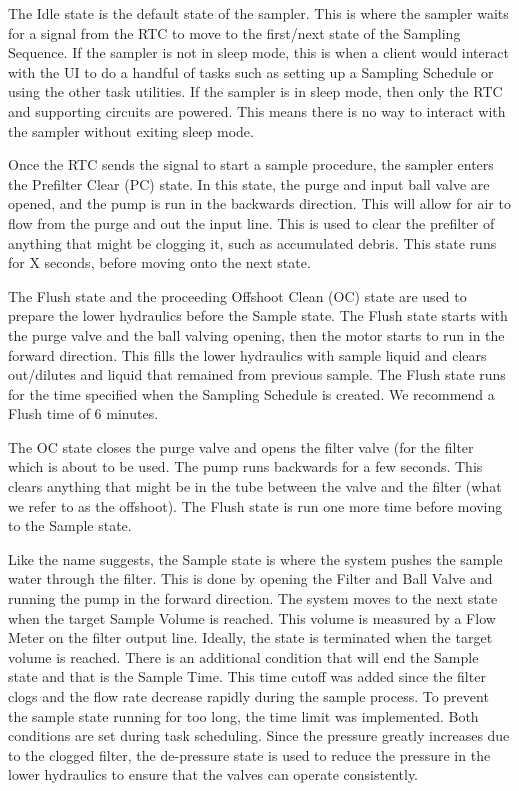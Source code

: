 \documentclass[11pt, letterpaper]{article}
\begin{document}
The Idle state is the default state of the sampler. This is where the sampler waits for a signal from the RTC to move to the first/next state of the Sampling Sequence. If the sampler is not in sleep mode, this is when a client would interact with the UI to do a handful of tasks such as setting up a Sampling Schedule or using the other task utilities. If the sampler is in sleep mode, then only the RTC and supporting circuits are powered. This means there is no way to interact with the sampler without exiting sleep mode.
\newline\par
Once the RTC sends the signal to start a sample procedure, the sampler enters the Prefilter Clear (PC) state. In this state, the purge and input ball valve are opened, and the pump is run in the backwards direction. This will allow for air to flow from the purge and out the input line. This is used to clear the prefilter of anything that might be clogging it, such as accumulated debris. This state runs for X seconds, before moving onto the next state. 
\newline\par
The Flush state and the proceeding Offshoot Clean (OC) state are used to prepare the lower hydraulics before the Sample state. The Flush state starts with the purge valve and the ball valving opening, then the motor starts to run in the forward direction. This fills the lower hydraulics with sample liquid and clears out/dilutes and liquid that remained from previous sample. The Flush state runs for the time specified when the Sampling Schedule is created. We recommend a Flush time of 6 minutes. 
\newline\par
The OC state closes the purge valve and opens the filter valve (for the filter which is about to be used. The pump runs backwards for a few seconds. This clears anything that might be in the tube between the valve and the filter (what we refer to as the offshoot). The Flush state is run one more time before moving to the Sample state.
\newline\par
Like the name suggests, the Sample state is where the system pushes the sample water through the filter. This is done by opening the Filter and Ball Valve and running the pump in the forward direction. The system moves to the next state when the target Sample Volume is reached. This volume is measured by a Flow Meter on the filter output line. Ideally, the state is terminated when the target volume is reached. There is an additional condition that will end the Sample state and that is the Sample Time. This time cutoff was added since the filter clogs and the flow rate decrease rapidly during the sample process. To prevent the sample state running for too long, the time limit was implemented. Both conditions are set during task scheduling. Since the pressure greatly increases due to the clogged filter, the de-pressure state is used to reduce the pressure in the lower hydraulics to ensure that the valves can operate consistently.
\end{document}
